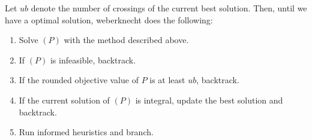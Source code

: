 \documentclass[a4paper,UKenglish,cleveref, autoref, thm-restate]{lipics-v2021}
\begin{document}
Let $ub$ denote the number of crossings of the current best solution.
Then, until we have a optimal solution, \textsf{weberknecht} does the following:
\begin{enumerate}[1.]
\item Solve $(P)$ with the method described above.
\item If $(P)$ is infeasible, backtrack.
\item If the rounded objective value of $P$ is at least $ub$, backtrack.
\item If the current solution of $(P)$ is integral, update the best solution and backtrack.
\item Run informed heuristics and branch.
\end{enumerate}


\end{document}
